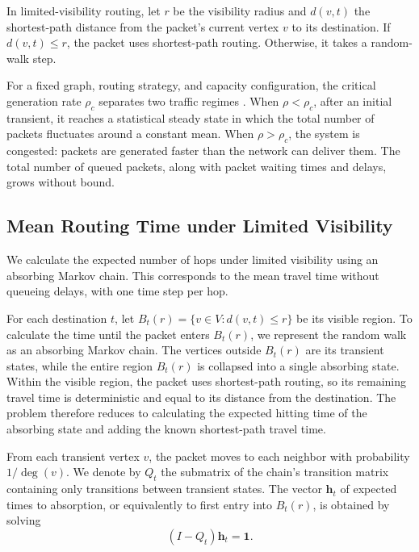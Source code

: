 \documentclass[a4paper]{article}
\begin{document}
In limited-visibility routing, let $r$ be the visibility radius and
$d(v,t)$ the shortest-path distance from the packet's current vertex
$v$ to its destination. If $d(v,t) \leq r$, the packet uses
shortest-path routing. Otherwise, it takes a random-walk step.

For a fixed graph, routing strategy, and capacity configuration, the
critical generation rate $\rho_c$ separates two traffic regimes
\cite{chenTrafficDynamicsComplex2012}. When $\rho < \rho_c$, after an initial transient, it
reaches a statistical steady state in which the total number of
packets fluctuates around a constant mean. When $\rho > \rho_c$,
the system is congested: packets are generated faster than the
network can deliver them. The total number of queued packets, along
with packet waiting times and delays, grows without bound.

\subsection{Mean Routing Time under Limited Visibility}
\label{sec:limited_visibility_time}

We calculate the expected number of hops under limited visibility
using an absorbing Markov chain. This corresponds to the mean travel
time without queueing delays, with one time step per hop.

For each destination $t$, let $B_t(r)=\{v \in V : d(v,t) \leq r\}$
be its visible region. To calculate the time until the packet enters
$B_t(r)$, we represent the random walk as an absorbing Markov chain.
The vertices outside $B_t(r)$ are its transient states, while the
entire region $B_t(r)$ is collapsed into a single absorbing state.
Within the visible region, the packet uses shortest-path routing, so
its remaining travel time is deterministic and equal to its distance
from the destination. The problem therefore reduces to calculating
the expected hitting time of the absorbing state and adding the
known shortest-path travel time.

From each transient vertex $v$, the packet moves to each neighbor
with probability $1/\deg(v)$. We denote by $Q_t$ the submatrix of the
chain's transition matrix containing only transitions between
transient states. The vector $\mathbf{h}_t$ of expected times
to absorption, or equivalently to first entry into $B_t(r)$, is
obtained by solving
\begin{equation}
    (I-Q_t)\mathbf{h}_t=\mathbf{1}.
\end{equation}
\end{document}
